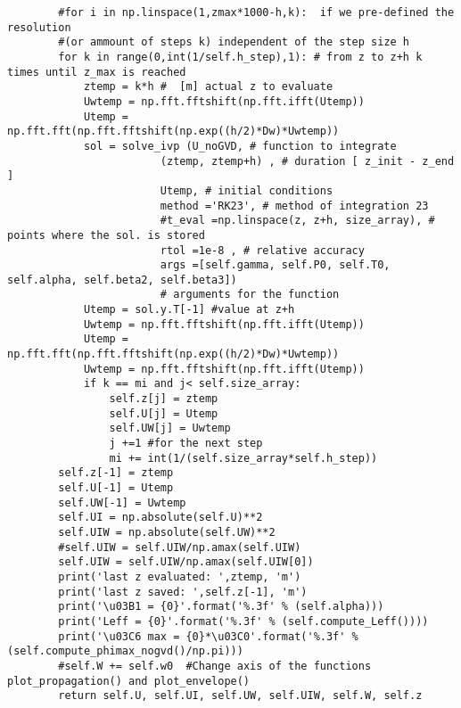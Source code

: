 \begin{verbatim}
        #for i in np.linspace(1,zmax*1000-h,k):  if we pre-defined the resolution 
        #(or ammount of steps k) independent of the step size h
        for k in range(0,int(1/self.h_step),1): # from z to z+h k times until z_max is reached
            ztemp = k*h #  [m] actual z to evaluate
            Uwtemp = np.fft.fftshift(np.fft.ifft(Utemp))
            Utemp = np.fft.fft(np.fft.fftshift(np.exp((h/2)*Dw)*Uwtemp))
            sol = solve_ivp (U_noGVD, # function to integrate
                        (ztemp, ztemp+h) , # duration [ z_init - z_end ]
                        Utemp, # initial conditions
                        method ='RK23', # method of integration 23
                        #t_eval =np.linspace(z, z+h, size_array), # points where the sol. is stored
                        rtol =1e-8 , # relative accuracy
                        args =[self.gamma, self.P0, self.T0, self.alpha, self.beta2, self.beta3]) 
                        # arguments for the function
            Utemp = sol.y.T[-1] #value at z+h
            Uwtemp = np.fft.fftshift(np.fft.ifft(Utemp))
            Utemp = np.fft.fft(np.fft.fftshift(np.exp((h/2)*Dw)*Uwtemp))
            Uwtemp = np.fft.fftshift(np.fft.ifft(Utemp))
            if k == mi and j< self.size_array:
                self.z[j] = ztemp
                self.U[j] = Utemp
                self.UW[j] = Uwtemp
                j +=1 #for the next step
                mi += int(1/(self.size_array*self.h_step))
        self.z[-1] = ztemp
        self.U[-1] = Utemp
        self.UW[-1] = Uwtemp
        self.UI = np.absolute(self.U)**2
        self.UIW = np.absolute(self.UW)**2
        #self.UIW = self.UIW/np.amax(self.UIW) 
        self.UIW = self.UIW/np.amax(self.UIW[0])
        print('last z evaluated: ',ztemp, 'm')
        print('last z saved: ',self.z[-1], 'm')
        print('\u03B1 = {0}'.format('%.3f' % (self.alpha)))
        print('Leff = {0}'.format('%.3f' % (self.compute_Leff())))
        print('\u03C6 max = {0}*\u03C0'.format('%.3f' % (self.compute_phimax_nogvd()/np.pi)))
        #self.W += self.w0  #Change axis of the functions plot_propagation() and plot_envelope()
        return self.U, self.UI, self.UW, self.UIW, self.W, self.z


\end{verbatim}
